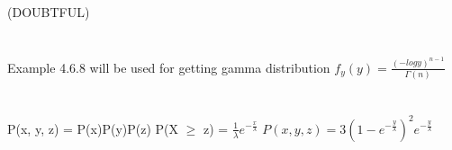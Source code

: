 \documentclass{report}
\begin{document}
\section{}
(DOUBTFUL)
\newline
\section{}
Example 4.6.8 will be used for getting gamma distribution
\newline
$f_y(y) = \frac{(-logy)^{n-1}}{\Gamma(n)}$
\newline
\section{}
P(x, y, z) = P(x)P(y)P(z)
\newline
P(X $\ge$ z) = $\frac{1}{\lambda}e^{-\frac{x}{\lambda}}$
\newline
$P(x, y, z) = 3 (1 - e^{-\frac{y}{\lambda}})^2e^{-\frac{y}{\lambda}}$
\newline
\section{}
\end{document}
